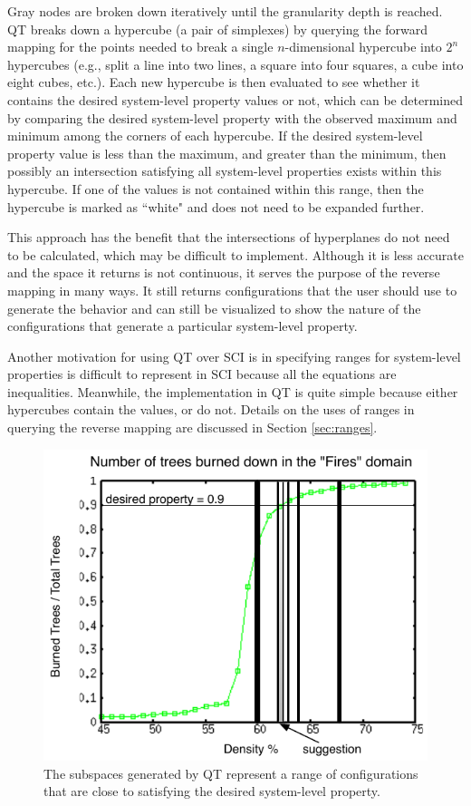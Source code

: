 Gray nodes are broken down iteratively until the granularity depth is reached.
QT breaks down a hypercube (a pair of simplexes) by querying the forward mapping for the points needed to break a single $n$-dimensional hypercube into $2^n$ hypercubes (e.g., split a line into two lines, a square into four squares, a cube into eight cubes, etc.).
Each new hypercube is then evaluated to see whether it contains the desired system-level property values or not, which can be determined by comparing the desired system-level property with the observed maximum and minimum among the corners of each hypercube.
If the desired system-level property value is less than the maximum, and greater than the minimum, then possibly an intersection satisfying all system-level properties exists within this hypercube.
If one of the values is not contained within this range, then the hypercube is marked as ``white" and does not need to be expanded further.

This approach has the benefit that the intersections of hyperplanes do not need to be calculated, which may be difficult to implement.
Although it is less accurate and the space it returns is not continuous, it serves the purpose of the reverse mapping in many ways.
It still returns configurations that the user should use to generate the behavior and can still be visualized to show the nature of the configurations that generate a particular system-level property.

Another motivation for using QT over SCI is in specifying ranges for system-level properties is difficult to represent in SCI because all the equations are inequalities.
Meanwhile, the implementation in QT is quite simple because either hypercubes contain the values, or do not.
Details on the uses of ranges in querying the reverse mapping are discussed in Section \ref{sec:ranges}.

\begin{figure}[ht]
\centering
\includegraphics[scale=1]{images/QTfires.pdf}
\caption{The subspaces generated by QT represent a range of configurations that are close to satisfying the desired system-level property.}
\label{fig:qtfires}
\end{figure}

